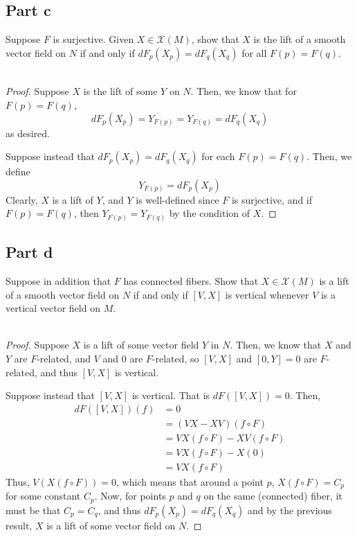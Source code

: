 \documentclass[fontsize=11pt]{scrartcl} %
\numberwithin{equation}{section} %
\numberwithin{figure}{section} %
\numberwithin{table}{section} %
\begin{document}
\subsection*{Part c}
Suppose $F$ is surjective. Given $X\in\mathcal{X}(M)$, show that $X$ is the lift
of a smooth vector field on $N$ if and only if $dF_p(X_p) = dF_q(X_q)$ for all
$F(p) = F(q)$.
\\
\\
\begin{proof}
    Suppose $X$ is the lift of some $Y$ on $N$. Then, we know that for $F(p) =
    F(q)$,
    \[
        dF_p(X_p) = Y_{F(p)}=Y_{F(q)}=dF_q(X_q)
    \]
    as desired.

    Suppose instead that $dF_p(X_p)=dF_q(X_q)$ for each $F(p)=F(q)$. Then, we
    define
    \[
        Y_{F(p)} = dF_p(X_p)
    \]
    Clearly, $X$ is a lift of $Y$, and $Y$ is well-defined since $F$ is
    surjective, and if $F(p)=F(q)$, then $Y_{F(p)}=Y_{F(q)}$ by the condition of
    $X$.
\end{proof}

\subsection*{Part d}
Suppose in addition that $F$ has connected fibers. Show that
$X\in\mathcal{X}(M)$ is a lift of a smooth vector field on $N$ if and only if
$[V,X]$ is vertical whenever $V$ is a vertical vector field on $M$.
\\
\\
\begin{proof}
Suppose $X$ is a lift of some vector field $Y$ in $N$. Then,
we know that $X$ and $Y$ are $F$-related, and $V$ and $0$ are $F$-related, so
    $[V,X]$ and $[0,Y]=0$ are $F$-related, and thus $[V,X]$ is vertical.

    Suppose instead that $[V,X]$ is vertical. That is $dF([V,X])=0$.
    Then,
    \[
        \begin{aligned}
            dF([V,X])(f) &= 0\\
                        &= (VX-XV)(f\circ F)\\
                        &=VX(f\circ F) - XV(f\circ F)\\
                        &=VX(f\circ F) - X(0)\\
                        &=VX(f\circ F)
        \end{aligned}
    \]
    Thus, $V(X(f\circ F)) = 0$, which means that around a point $p$, $X(f\circ
    F) = C_p$ for some constant $C_p$. Now, for points $p$ and $q$ on the same
    (connected) fiber, it must be that $C_p=C_q$, and thus $dF_p(X_p)
    =dF_q(X_q)$ and by the previous result, $X$ is a lift of some vector field
    on $N$.
\end{proof}
\end{document}
